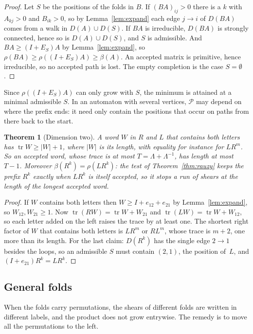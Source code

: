 \documentclass[11pt]{amsart}
\newcommand{\Lam}{\Lambda}
\newcommand{\D}{D}
\newcommand{\Pos}{\mathcal{P}}
\newcommand{\tr}{\operatorname{tr}}
\theoremstyle{plain}
\newtheorem{Theorem}{Theorem}[section]
\theoremstyle{definition}
\begin{document}
\begin{proof}
  Let $S$ be the positions of the folds in $B$.  If $(BA)_{ij}>0$ there is
  a $k$ with $A_{kj}>0$ and $B_{ik}>0$, so by Lemma~\ref{lem:expand} each
  edge $j\to i$ of $\D(BA)$ comes from a walk in $\D(A)\cup\D(S)$.  If $BA$
  is irreducible, $\D(BA)$ is strongly connected, hence so is
  $\D(A)\cup\D(S)$, and $S$ is admissible.  And $BA\ge(I+E_S)A$ by
  Lemma~\ref{lem:expand}, so $\rho(BA)\ge\rho((I+E_S)A)\ge\beta(A)$.  An
  accepted matrix is primitive, hence irreducible, so no accepted path is
  lost.  The empty completion is the case $S=\emptyset$.
\end{proof}

Since $\rho((I+E_S)A)$ can only grow with $S$, the minimum is attained at a
minimal admissible $S$.  In an automaton with several vertices, $\Pos$ may
depend on where the prefix ends: it need only contain the positions that
occur on paths from there back to the start.

\begin{Theorem}[Dimension two]
  \label{thm:d2}
  A word $W$ in $R$ and $L$ that contains both letters has
  $\tr W\ge|W|+1$, where $|W|$ is its length, with equality for instance
  for $LR^m$.  So an accepted word, whose trace is at most
  $T=\Lam+\Lam^{-1}$, has length at most $T-1$.  Moreover
  $\beta(R^k)=\rho(LR^k)$: the test of Theorem~\ref{thm:rauzy} keeps the
  prefix $R^k$ exactly when $LR^k$ is itself accepted, so it stops a run of
  shears at the length of the longest accepted word.
\end{Theorem}

\begin{proof}
  If $W$ contains both letters then $W\ge I+e_{12}+e_{21}$ by
  Lemma~\ref{lem:expand}, so $W_{12},W_{21}\ge1$.  Now
  $\tr(RW)=\tr W+W_{21}$ and $\tr(LW)=\tr W+W_{12}$, so each letter added
  on the left raises the trace by at least one.  The shortest right factor
  of $W$ that contains both letters is $LR^m$ or $RL^m$, whose trace is
  $m+2$, one more than its length.  For the last claim: $\D(R^k)$ has the
  single edge $2\to1$ besides the loops, so an admissible $S$ must contain
  $(2,1)$, the position of~$L$, and $(I+e_{21})R^k=LR^k$.
\end{proof}

\subsection{General folds}

When the folds carry permutations, the shears of different folds are
written in different labels, and the product does not grow entrywise.
The remedy is to move all the permutations to the left.
\end{document}
